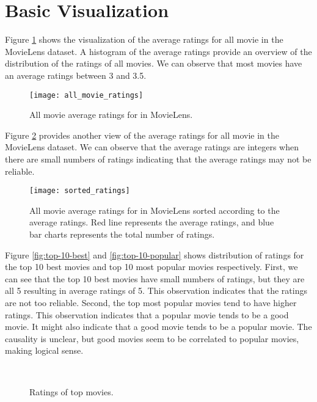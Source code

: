 \section{Basic Visualization}

Figure \ref{fig:all-movie} shows the visualization of the average ratings for all movie in the MovieLens dataset. A histogram of the average ratings provide an overview of the distribution of the ratings of all movies. We can observe that most movies have an average ratings between 3 and 3.5. 

\begin{figure}[H]
	\centering
	\texttt{[image: all\_movie\_ratings]}
	\caption{All movie average ratings for in MovieLens.} \label{fig:all-movie}
\end{figure}


Figure \ref{fig:all-movie-sorted} provides another view of the average ratings for all movie in the MovieLens dataset. We can observe that the average ratings are integers when there are small numbers of ratings indicating that the average ratings may not be reliable.

\begin{figure}[H]
	\centering
	\texttt{[image: sorted\_ratings]}
	\caption{All movie average ratings for in MovieLens sorted according to the average ratings. Red line represents the average ratings, and blue bar charts represents the total number of ratings.} \label{fig:all-movie-sorted} 
\end{figure}

Figure \ref{fig:top-10-best} and \ref{fig:top-10-popular} shows distribution of ratings for the top 10 best movies and top 10 most popular movies respectively. First, we can see that the top 10 best movies have small numbers of ratings, but they are all 5 resulting in average ratings of 5. This observation indicates that the ratings are not too reliable. Second, the top most popular movies tend to have higher ratings. This observation indicates that a popular movie tends to be a good movie. It might also indicate that a good movie tends to be a popular movie. The causality is unclear, but good movies seem to be correlated to popular movies, making logical sense. 

\begin{figure}[H]
	\centering
	\\
	\caption{Ratings of top movies.} 
\end{figure}

